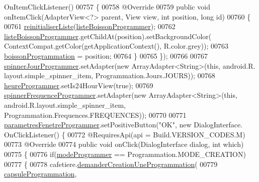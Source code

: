 \begin{DoxyCode}
      OnItemClickListener()
00757         \{
00758             @Override
00759             \textcolor{keyword}{public} \textcolor{keywordtype}{void} onItemClick(AdapterView<?> parent, View view, \textcolor{keywordtype}{int} position, \textcolor{keywordtype}{long} \textcolor{keywordtype}{id})
00760             \{
00761                 \hyperlink{classcom_1_1example_1_1ekawa_1_1_ihm_a4c6ea5a7de9f8fc5c820fa4c8ce14838}{reinitialiserListe}(\hyperlink{classcom_1_1example_1_1ekawa_1_1_ihm_a8badf9f0485d205f8a379e54b01deab7}{listeBoissonProgrammer});
00762                 \hyperlink{classcom_1_1example_1_1ekawa_1_1_ihm_a8badf9f0485d205f8a379e54b01deab7}{listeBoissonProgrammer}.getChildAt(position).setBackgroundColor(
      ContextCompat.getColor(getApplicationContext(), R.color.grey));
00763                 \hyperlink{classcom_1_1example_1_1ekawa_1_1_ihm_a6ad8136ec35fff9e96476c4f35726fea}{boissonProgrammation} = position;
00764             \}
00765         \});
00766 
00767         \hyperlink{classcom_1_1example_1_1ekawa_1_1_ihm_a49e6261929f259b2fcc81bf13d21ad7f}{spinnerJourProgrammer}.setAdapter(\textcolor{keyword}{new} ArrayAdapter<String>(\textcolor{keyword}{this}, android.R.
      layout.simple\_spinner\_item, Programmation.Jours.JOURS));
00768         \hyperlink{classcom_1_1example_1_1ekawa_1_1_ihm_ac6f46062030a20efac18673970d37547}{heureProgrammer}.setIs24HourView(\textcolor{keyword}{true});
00769         \hyperlink{classcom_1_1example_1_1ekawa_1_1_ihm_ab266576a3855dbd6e36e346ddb27247a}{spinnerFrequenceProgrammer}.setAdapter(\textcolor{keyword}{new} ArrayAdapter<String>(\textcolor{keyword}{this}, 
      android.R.layout.simple\_spinner\_item, Programmation.Frequences.FREQUENCES));
00770 
00771         \hyperlink{classcom_1_1example_1_1ekawa_1_1_ihm_a6eb2afb2fe8da7f3a749089c84934145}{parametresFenetreProgrammer}.setPositiveButton(\textcolor{stringliteral}{"OK"}, \textcolor{keyword}{new} DialogInterface.
      OnClickListener() \{
00772             @RequiresApi(api = Build.VERSION\_CODES.M)
00773             @Override
00774             \textcolor{keyword}{public} \textcolor{keywordtype}{void} onClick(DialogInterface dialog, \textcolor{keywordtype}{int} which)
00775             \{
00776                 \textcolor{keywordflow}{if}(\hyperlink{classcom_1_1example_1_1ekawa_1_1_ihm_acc8db4ba4fa39c343412d6ff57c2acbd}{modeProgrammer} == Programmation.MODE\_CREATION)
00777                 \{
00778                     cafetiere.\hyperlink{classcom_1_1example_1_1ekawa_1_1_cafetiere_a2657310905f93ef4fba5b5f1dad81be9}{demanderCreationUneProgrammation}(
00779                         \hyperlink{classcom_1_1example_1_1ekawa_1_1_ihm_a2ddf5b95e2a3fbb3a15d160ba266295a}{capsuleProgrammation},

\end{DoxyCode}
